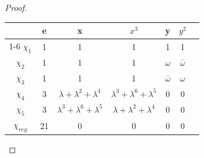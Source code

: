 \documentclass{article}
\begin{document}
\begin{proof}
    \begin{tabular}{c | c c c c c c }
        & e & x & $x^3$ & y & $y^2$  \\
        \cline{1-6}
        $\chi_1$ & 1 & 1 & 1 & 1 & 1 \\
        $\chi_2$ & 1 & 1 & 1 & $\omega$  & $\bar{\omega}$  \\
        $\chi_3$ & 1 & 1 & 1 & $\bar{\omega}$  & $\omega$  \\
        $\chi_4$ & 3 & $\lambda + \lambda^2 +\lambda^4$ & $\lambda^3 + \lambda^6 +\lambda^5$ & 0 & 0 \\
        $\chi_5$ & 3 &  $\lambda^3 + \lambda^6 +\lambda^5$ & $\lambda + \lambda^2 +\lambda^4$ & 0 & 0 \\
        $\chi_{reg}$ & 21 & 0 & 0 & 0 & 0 

    \end{tabular} 
\end{proof}

\bigskip
\end{document}

